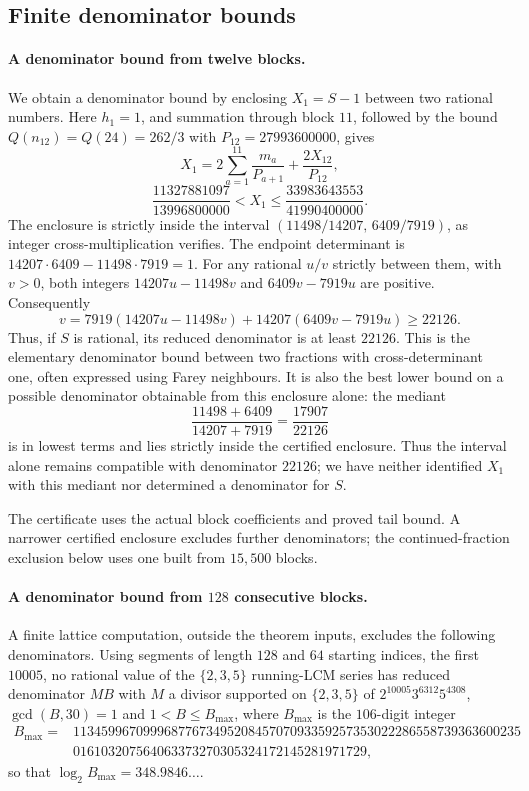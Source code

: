 \subsection{Finite denominator bounds}

\paragraph{A denominator bound from twelve blocks.}
We obtain a denominator bound by enclosing $X_1=S-1$ between two rational
numbers. Here $h_1=1$, and summation through block $11$, followed by the
bound $Q(n_{12})=Q(24)=262/3$ with $P_{12}=27993600000$, gives
\[
 X_1=2\sum_{a=1}^{11}\frac{m_a}{P_{a+1}}
          +\frac{2X_{12}}{P_{12}},
\]
\[
 \frac{11327881097}{13996800000}<X_1
 \le\frac{33983643553}{41990400000}.
\]
The enclosure is strictly inside the interval
$(11498/14207,\,6409/7919)$, as integer cross-multiplication verifies.
The endpoint determinant is $14207\cdot6409-11498\cdot7919=1$.
For any rational $u/v$ strictly between them, with $v>0$, both integers
$14207u-11498v$ and $6409v-7919u$ are positive.  Consequently
\[
 v=7919(14207u-11498v)+14207(6409v-7919u)\ge22126.
\]
Thus, if $S$ is rational, its reduced denominator is at least $22126$.
This is the elementary denominator bound between two fractions with
cross-determinant one, often expressed using Farey neighbours.  It is
also the best lower bound on a possible denominator obtainable from
this enclosure alone: the mediant
\[
 \frac{11498+6409}{14207+7919}=\frac{17907}{22126}
\]
is in lowest terms and lies strictly inside the certified enclosure.
Thus the interval alone remains compatible with denominator $22126$;
we have neither identified $X_1$ with this mediant nor determined a
denominator for $S$.

The certificate uses the actual block coefficients and proved tail
bound.  A narrower certified enclosure excludes further denominators;
the continued-fraction exclusion below uses one built from $15{,}500$
blocks.

\paragraph{A denominator bound from $128$ consecutive blocks.}
\label{long269:res:lead-block-exclusion}
A finite lattice computation, outside the theorem inputs, excludes the
following denominators.  Using segments of length $128$ and $64$ starting
indices, the first $10005$, no rational value
of the $\{2,3,5\}$ running-LCM series has reduced denominator $MB$ with $M$ a
divisor supported on $\{2,3,5\}$ of $2^{10005}3^{6312}5^{4308}$, $\gcd(B,30)=1$ and
$1<B\le B_{\max}$, where $B_{\max}$ is the $106$-digit integer
\[
\begin{aligned}
 B_{\max}={}&1134599670999687767349520845707093359257353022286558739363600235\\
 &016103207564063373270305324172145281971729 ,
\end{aligned}
\]
so that $\log_2B_{\max}=348.9846\ldots$.


